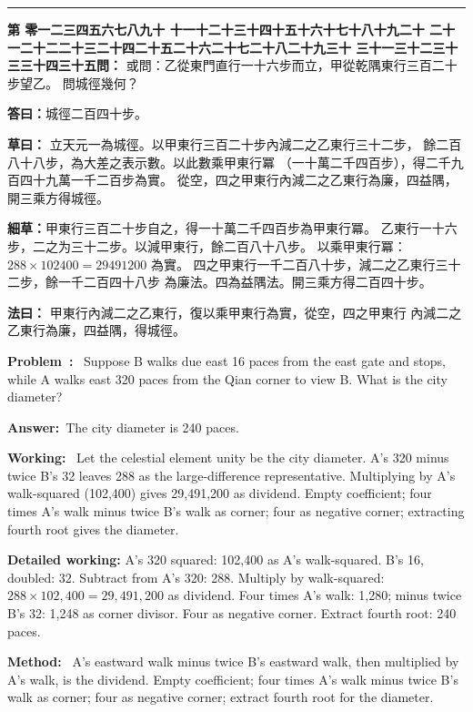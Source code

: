 \documentclass[9pt,a4paper]{article}
\newcounter{probnum}
\newcounter{overallnum}
\newcommand{\chnum}[1]{%
  \ifcase#1 零\or 一\or 二\or 三\or 四\or 五\or 六\or 七\or 八\or 九\or 十\or
    十一\or 十二\or 十三\or 十四\or 十五\or 十六\or 十七\or 十八\or 十九\or 二十\or
    二十一\or 二十二\or 二十三\or 二十四\or 二十五\or 二十六\or 二十七\or 二十八\or 二十九\or 三十\or
    三十一\or 三十二\or 三十三\or 三十四\or 三十五\fi}
\newcommand{\problem}[1]{\stepcounter{probnum}\stepcounter{overallnum}\par\noindent\textbf{\color{volcolor}第\chnum{\value{probnum}}問：}#1\par\vspace{0.15cm}}
\newcommand{\answer}[1]{\par\noindent\textbf{答曰：}#1\par\vspace{0.15cm}}
\newcommand{\working}[1]{\par\noindent\textbf{草曰：}#1\par\vspace{0.15cm}}
\newcommand{\method}[1]{\par\noindent\textbf{法曰：}#1\par\vspace{0.25cm}}
\newcommand{\eproblem}[1]{\par\noindent\textbf{\color{volcolor}Problem~\theoverallnum:}~#1\par\vspace{0.15cm}}
\newcommand{\eanswer}[1]{\par\noindent\textbf{Answer:}~#1\par\vspace{0.15cm}}
\newcommand{\eworking}[1]{\par\noindent\textbf{Working:}~#1\par\vspace{0.15cm}}
\newcommand{\emethod}[1]{\par\noindent\textbf{Method:}~#1\par\vspace{0.25cm}}
\begin{document}
\vspace{0.15cm}
\noindent\rule{\textwidth}{0.2pt}
\vspace{0.15cm}

\noindent\begin{minipage}[t]{0.48\textwidth}
\problem{
或問：乙從東門直行一十六步而立，甲從乾隅東行三百二十步望乙。
問城徑幾何？
}

\answer{城徑二百四十步。}

\working{
立天元一為城徑。以甲東行三百二十步內減二之乙東行三十二步，
餘二百八十八步，為大差之表示數。以此數乘甲東行冪
（一十萬二千四百步），得二千九百四十九萬一千二百步為實。
從空，四之甲東行內減二之乙東行為廉，四益隅，開三乘方得城徑。

\textbf{細草：}甲東行三百二十步自之，得一十萬二千四百步為甲東行冪。
乙東行一十六步，二之为三十二步。以減甲東行，餘二百八十八步。
以乘甲東行冪：$288 \times 102400 = 29491200$ 為實。
四之甲東行一千二百八十步，減二之乙東行三十二步，餘一千二百四十八步
為廉法。四為益隅法。開三乘方得二百四十步。
}

\method{
甲東行內減二之乙東行，復以乘甲東行為實，從空，四之甲東行
內減二之乙東行為廉，四益隅，得城徑。
}
\end{minipage}%
\hfill%
\begin{minipage}[t]{0.50\textwidth}
\eproblem{
Suppose B walks due east 16 paces from the east gate and stops, while A walks
east 320 paces from the Qian corner to view B. What is the city diameter?
}

\eanswer{The city diameter is 240 paces.}

\eworking{
Let the celestial element unity be the city diameter. A's 320 minus twice
B's 32 leaves 288 as the large-difference representative. Multiplying by
A's walk-squared (102,400) gives 29,491,200 as dividend. Empty coefficient;
four times A's walk minus twice B's walk as corner; four as negative corner;
extracting fourth root gives the diameter.

\textbf{Detailed working:} A's 320 squared: 102,400 as A's walk-squared.
B's 16, doubled: 32. Subtract from A's 320: 288. Multiply by walk-squared:
$288 \times 102{,}400 = 29{,}491{,}200$ as dividend. Four times A's walk:
1,280; minus twice B's 32: 1,248 as corner divisor. Four as negative corner.
Extract fourth root: 240 paces.
}

\emethod{
A's eastward walk minus twice B's eastward walk, then multiplied by A's walk,
is the dividend. Empty coefficient; four times A's walk minus twice B's walk
as corner; four as negative corner; extract fourth root for the diameter.
}
\end{minipage}
\vspace{0.15cm}
\end{document}
